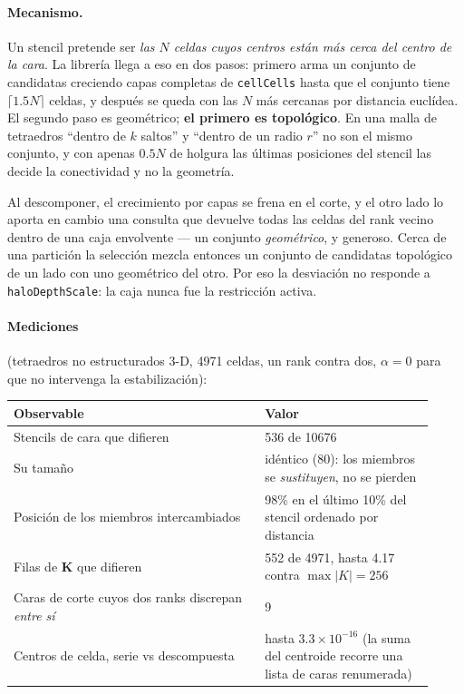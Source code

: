 \documentclass[11pt,a4paper]{article}
\newcommand{\code}[1]{\texttt{\small #1}}
\newcommand{\Kstif}{\mathbf{K}}
\newcommand{\dictkey}[1]{\textcolor{black!60!green}{\texttt{\footnotesize #1}}}
\begin{document}
\paragraph{Mecanismo.} Un stencil pretende ser \emph{las $N$ celdas cuyos centros
están más cerca del centro de la cara}. La librería llega a eso en dos pasos:
primero arma un conjunto de candidatas creciendo capas completas de
\code{cellCells} hasta que el conjunto tiene $\lceil 1.5N \rceil$ celdas, y
después se queda con las $N$ más cercanas por distancia euclídea. El segundo paso
es geométrico; \textbf{el primero es topológico}. En una malla de tetraedros
``dentro de $k$ saltos'' y ``dentro de un radio $r$'' no son el mismo conjunto, y
con apenas $0.5N$ de holgura las últimas posiciones del stencil las decide la
conectividad y no la geometría.

Al descomponer, el crecimiento por capas se frena en el corte, y el otro lado lo
aporta en cambio una consulta que devuelve todas las celdas del rank vecino
dentro de una caja envolvente --- un conjunto \emph{geométrico}, y generoso.
Cerca de una partición la selección mezcla entonces un conjunto de candidatas
topológico de un lado con uno geométrico del otro. Por eso la desviación no
responde a \dictkey{haloDepthScale}: la caja nunca fue la restricción activa.

\paragraph{Mediciones} (tetraedros no estructurados 3-D, 4971 celdas, un rank
contra dos, $\alpha=0$ para que no intervenga la estabilización):

\begin{center}
\begin{tabular}{@{}p{0.55\linewidth}p{0.37\linewidth}@{}}
\toprule
Observable & Valor \\
\midrule
Stencils de cara que difieren & 536 de 10676 \\
Su tamaño & idéntico (80): los miembros se \emph{sustituyen}, no se pierden \\
Posición de los miembros intercambiados & 98\% en el último 10\% del stencil
   ordenado por distancia \\
Filas de $\Kstif$ que difieren & 552 de 4971, hasta 4.17 contra
   $\max|K|=256$ \\
Caras de corte cuyos dos ranks discrepan \emph{entre sí} & 9 \\
Centros de celda, serie vs descompuesta & hasta $3.3\times10^{-16}$ (la suma del
   centroide recorre una lista de caras renumerada) \\
\bottomrule
\end{tabular}
\end{center}
\end{document}
